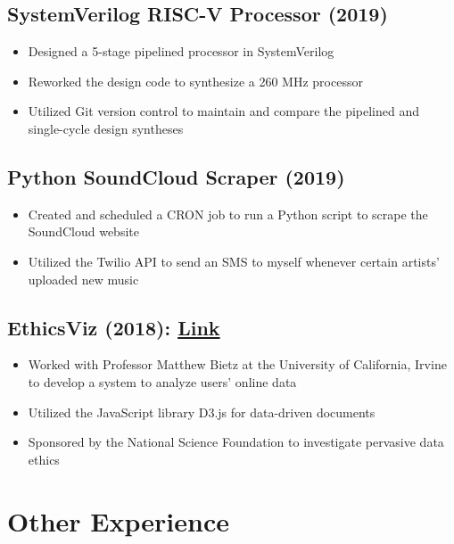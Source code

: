 \documentclass[10pt]{article}
\begin{document}
\begin{multicols}{2}
\subsection{SystemVerilog RISC-V Processor (2019)}

\begin{itemize}
	\setlength\itemsep{0em}
	\item Designed a 5-stage pipelined processor in SystemVerilog
	\item Reworked the design code to synthesize a 260 MHz processor
	\item Utilized Git version control to maintain and compare the pipelined and single-cycle design syntheses
\end{itemize}

\subsection{Python SoundCloud Scraper (2019)}

\begin{itemize}
	\setlength\itemsep{0em}
	\item Created and scheduled a CRON job to run a Python script to scrape the SoundCloud website
	\item Utilized the Twilio API to send an SMS to myself whenever certain artists' uploaded new music
\end{itemize}

\subsection{EthicsViz (2018): \href{https://pervade.umd.edu/}{Link}}

\begin{itemize}
	\setlength\itemsep{0em}
	\item Worked with Professor Matthew Bietz at the University of California, Irvine to develop a system to analyze users' online data
	\item Utilized the JavaScript library D3.js for data-driven documents
	\item Sponsored by the National Science Foundation to investigate pervasive data ethics
\end{itemize}
\end{multicols}

\vfill	

\section{Other Experience}
\end{document}
